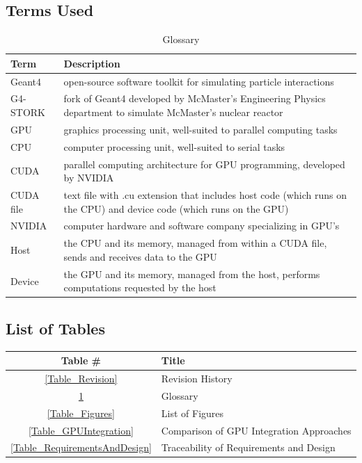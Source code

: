 \documentclass[12pt]{article}
\begin{document}
\subsection{Terms Used}
\begin{table}[h]
\centering
\caption{Glossary}\label{Table_Glossary}
\begin{tabularx}{\textwidth}{lX}
\toprule
\bf Term & \bf Description\\\midrule\vspace{1mm}
Geant4 & open-source software toolkit for simulating particle interactions\\\vspace{1mm}
G4-STORK & fork of Geant4 developed by McMaster's Engineering Physics department to simulate McMaster's nuclear reactor\\\vspace{1mm}
GPU & graphics processing unit, well-suited to parallel computing tasks\\\vspace{1mm}
CPU & computer processing unit, well-suited to serial tasks\\\vspace{1mm}
CUDA & parallel computing architecture for GPU programming, developed by NVIDIA\\\vspace{1mm}
CUDA file & text file with .cu extension that includes host code (which runs on the CPU) and device code (which runs on the GPU)\\\vspace{1mm}
NVIDIA & computer hardware and software company specializing in GPU's\\\vspace{1mm}
Host & the CPU and its memory, managed from within a CUDA file, sends and receives data to the GPU\\\vspace{1mm}
Device & the GPU and its memory, managed from the host, performs computations requested by the host\\
\bottomrule
\end{tabularx}
\end{table}

\subsection{List of Tables}
\begin{center}
\begin{tabular}{cl}
\toprule
\bf Table \# & \bf Title\\\midrule
\ref{Table_Revision} & Revision History\\
\ref{Table_Glossary} & Glossary\\
\ref{Table_Figures}  & List of Figures\\
\ref{Table_GPUIntegration} & Comparison of GPU Integration Approaches\\
\ref{Table_RequirementsAndDesign} & Traceability of Requirements and Design\\
\bottomrule
\end{tabular}
\end{center}
\end{document}

